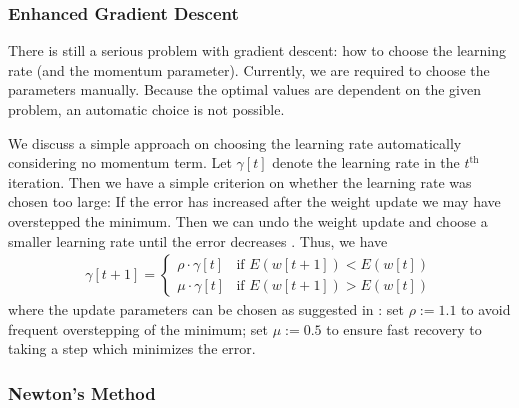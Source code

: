 \subsubsection{Enhanced Gradient Descent}

There is still a serious problem with gradient descent: how to choose the learning rate (and the momentum parameter). Currently, we are required to choose the parameters manually. Because the optimal values are dependent on the given problem, an automatic choice is not possible.

We discuss a simple approach on choosing the learning rate automatically considering no momentum term. Let $\gamma [t]$ denote the learning rate in the $t^{\text{th}}$ iteration. Then we have a simple criterion on whether the learning rate was chosen too large: If the error has increased after the weight update we may have overstepped the minimum. Then we can undo the weight update and choose a smaller learning rate until the error decreases \cite[p.~268-272]{Bishop:1995}. Thus, we have
\begin{align}
\gamma [t + 1] = 
\begin{cases}
\rho \cdot \gamma [t] & \text{if } E(w[t + 1]) < E(w[t]) \\
\mu \cdot \gamma [t] & \text{if } E(w[t + 1]) > E(w[t])
\end{cases}
\end{align}
where the update parameters can be chosen as suggested in \cite[p.~268-272]{Bishop:1995}: set $\rho := 1.1$ to avoid frequent overstepping of the minimum; set $\mu := 0.5$ to ensure fast recovery to taking a step which minimizes the error.

%

\subsubsection{Newton's Method}

